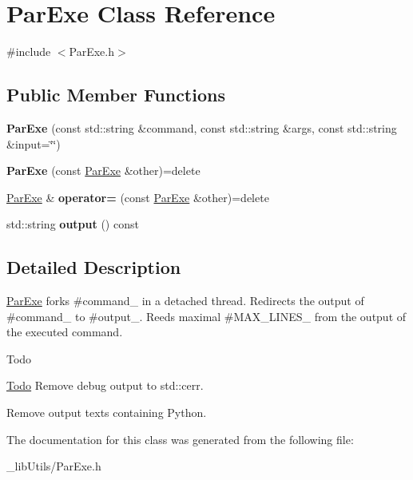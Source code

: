 \hypertarget{class_par_exe}{}\section{Par\+Exe Class Reference}
\label{class_par_exe}


{\ttfamily \#include $<$Par\+Exe.\+h$>$}

\subsection*{Public Member Functions}
\begin{DoxyCompactItemize}
\item 
\mbox{\label{class_par_exe_a8cc79409b6f5cdb1bd98d595618e245e}} 
{\bfseries Par\+Exe} (const std\+::string \&command, const std\+::string \&args, const std\+::string \&input=\char`\"{}\char`\"{})
\item 
\mbox{\label{class_par_exe_a78f0aa6a835dbb958fc29abd3457d414}} 
{\bfseries Par\+Exe} (const \mbox{\hyperlink{class_par_exe}{Par\+Exe}} \&other)=delete
\item 
\mbox{\label{class_par_exe_a200814420e4d2e6f3128c761789d0f1a}} 
\mbox{\hyperlink{class_par_exe}{Par\+Exe}} \& {\bfseries operator=} (const \mbox{\hyperlink{class_par_exe}{Par\+Exe}} \&other)=delete
\item 
\mbox{\label{class_par_exe_af951688b7cdbbc82ba6770a48a883acb}} 
std\+::string {\bfseries output} () const
\end{DoxyCompactItemize}


\subsection{Detailed Description}
\mbox{\hyperlink{class_par_exe}{Par\+Exe}} forks \#command\+\_\+ in a detached thread. Redirects the output of \#command\+\_\+ to \#output\+\_\+. Reeds maximal \#\+M\+A\+X\+\_\+\+L\+I\+N\+E\+S\+\_\+ from the output of the executed command. \begin{DoxyRefDesc}{Todo}
\item[\mbox{\hyperlink{todo__todo000001}{Todo}}]Remove debug output to std\+::cerr. 

Remove output texts containing Python. \end{DoxyRefDesc}


The documentation for this class was generated from the following file\+:\begin{DoxyCompactItemize}
\item 
\+\_\+lib\+Utils/Par\+Exe.\+h\end{DoxyCompactItemize}
